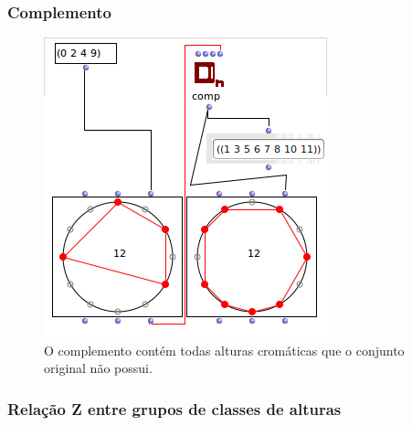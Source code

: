 \documentclass[
	12pt,				%
	openright,			%
	twoside,			%
	a4paper,			%
	english,			%
	french,				%
	spanish,			%
	brazil				%
	]{abntex2}
\begin{document}
\pagebreak
\subsubsection{Complemento}

\begin{figure}[!h]
	\caption{\label{fig_grafico}O complemento contém todas alturas cromáticas que o conjunto original não possui. }
	\begin{center}
	    \includegraphics[scale=0.6]{OM_settheory/complemento.png}
	\end{center}
\end{figure}

\lipsum[1]

\subsubsection{Relação Z entre grupos de classes de alturas}

\lipsum[17]
\end{document}
